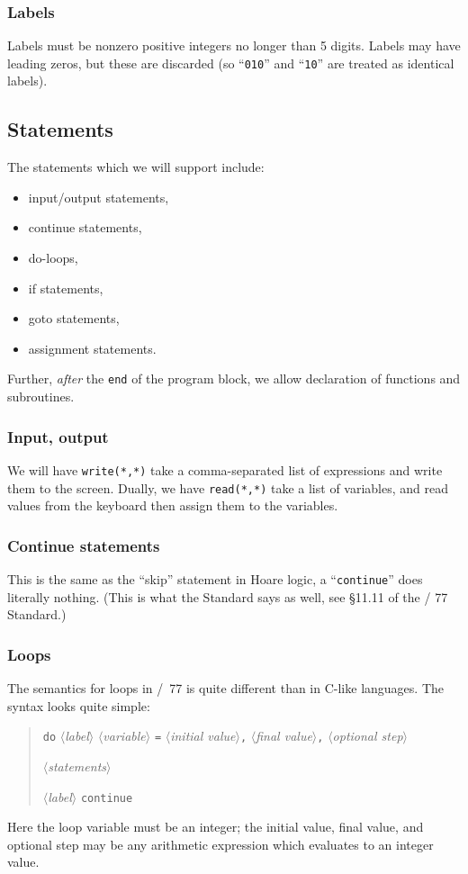 \subsubsection{Labels}
Labels must be nonzero positive integers no longer than 5 digits. Labels
may have leading zeros, but these are discarded (so ``\texttt{010}'' and
``\texttt{10}'' are treated as identical labels).

\subsection{Statements}
The statements which we will support include:
\begin{itemize}
\item input/output statements,
\item continue statements,
\item do-loops,
\item if statements,
\item goto statements,
\item assignment statements.
\end{itemize}
Further, \emph{after} the \texttt{end} of the program block, we allow
declaration of functions and subroutines.

\subsubsection{Input, output}
We will have \texttt{write(*,*)} take a comma-separated list of
expressions and write them to the screen. Dually, we have
\texttt{read(*,*)} take a list of variables, and read values from the
keyboard then assign them to the variables.

\subsubsection{Continue statements}
This is the same as the ``skip'' statement in Hoare logic, a
``\texttt{continue}'' does literally nothing. (This is what the Standard
says as well, see \S11.11 of the \FORTRAN/ 77 Standard.)

\subsubsection{Loops}
The semantics for loops in \FORTRAN/~77 is quite different than in
C-like languages. The syntax looks quite simple:
\begin{quotation}
\noindent\texttt{do} $\langle$\textit{label\/}$\rangle$
$\langle$\textit{variable\/}$\rangle$
\texttt{=} $\langle$\textit{initial value\/}$\rangle$\texttt{,}
$\langle$\textit{final value\/}$\rangle$\texttt{,}
$\langle$\textit{optional step\/}$\rangle$

$\langle$\textit{statements\/}$\rangle$

\noindent$\langle$\textit{label\/}$\rangle$ \texttt{continue}
\end{quotation}
Here the loop variable must be an integer; the initial value, final
value, and optional step may be any arithmetic expression which
evaluates to an integer value.

